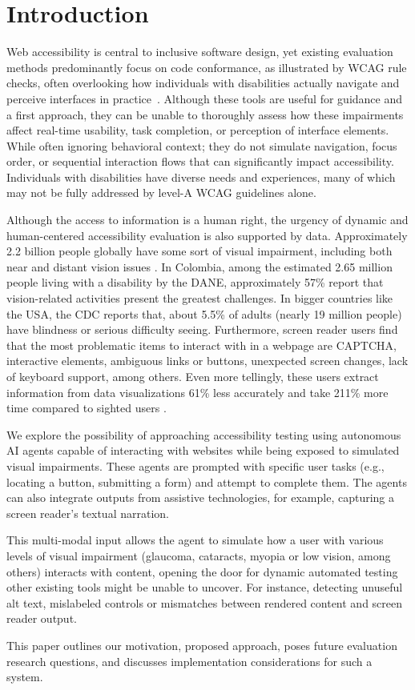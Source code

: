 
\section{Introduction}

Web accessibility is central to inclusive software design, yet existing evaluation methods predominantly focus on code conformance, as illustrated by \ac{WCAG} rule checks, often overlooking how individuals with disabilities actually navigate and perceive interfaces in practice~\cite{ara2024inclusive}. Although these tools are useful for guidance and a first approach, they can be unable to thoroughly assess how these impairments affect real-time usability, task completion, or perception of interface elements. While often ignoring behavioral context; they do not simulate navigation, focus order, or sequential interaction flows that can significantly impact accessibility. Individuals with disabilities have diverse needs and experiences, many of which may not be fully addressed by level-A \ac{WCAG} guidelines alone.

Although the access to information is a human right, the urgency of dynamic and human-centered accessibility evaluation is also supported by data. Approximately 2.2 billion people globally have some sort of visual impairment, including both near and distant vision issues \cite{who2023vision}. In Colombia, among the estimated 2.65 million people living with a disability by the DANE, approximately 57\% report that vision-related activities present the greatest challenges\cite{DANE2022}. In bigger countries like the USA, the CDC reports that, about 5.5\% of adults (nearly 19 million people) have blindness or serious difficulty seeing\cite{cdc2025disabilities}. Furthermore, screen reader users find that the most problematic items to interact with in a webpage are CAPTCHA, interactive elements, ambiguous links or buttons, unexpected screen changes, lack of keyboard support, among others\cite{webaimsurvey2025}. Even more tellingly, these users extract information from data visualizations 61\% less accurately and take 211\% more time compared to sighted users \cite{wobbrock2021assets}.

We explore the possibility of approaching accessibility testing using autonomous \ac{AI} agents capable of interacting with websites while being exposed to simulated visual impairments. These agents are prompted with specific user tasks (e.g., locating a button, submitting a form) and attempt to complete them. The agents can also integrate outputs from assistive technologies, for example, capturing a screen reader's textual narration. 

This multi-modal input allows the agent to simulate how a user with various levels of visual impairment (glaucoma, cataracts, myopia or low vision, among others) interacts with content, opening the door for dynamic automated testing other existing tools might be unable to uncover. For instance, detecting unuseful alt text, mislabeled controls or mismatches between rendered content and screen reader output. 

This paper outlines our motivation, proposed approach, poses future evaluation research questions, and discusses implementation considerations for such a system.
